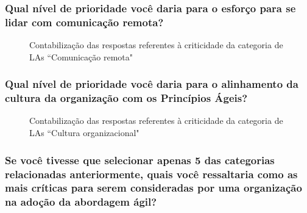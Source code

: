 \subsubsection{Qual nível de prioridade você daria para o esforço para se lidar com comunicação remota?}

\begin{figure}[H]
	\centering
	\captionsetup{justification=centering}
	\caption{Contabilização das respostas referentes à criticidade da categoria de LAs ``Comunicação remota"}
	\label{fig:result-remota}
\end{figure}

\subsubsection{Qual nível de prioridade você daria para o alinhamento da cultura da organização com os Princípios Ágeis?}

\begin{figure}[H]
	\centering
	\captionsetup{justification=centering}
	\caption{Contabilização das respostas referentes à criticidade da categoria de LAs ``Cultura organizacional"}
	\label{fig:result-cultura}
\end{figure}

\subsubsection{Se você tivesse que selecionar apenas 5 das categorias relacionadas anteriormente, quais você ressaltaria como as mais críticas para serem consideradas por uma organização na adoção da abordagem ágil?}

